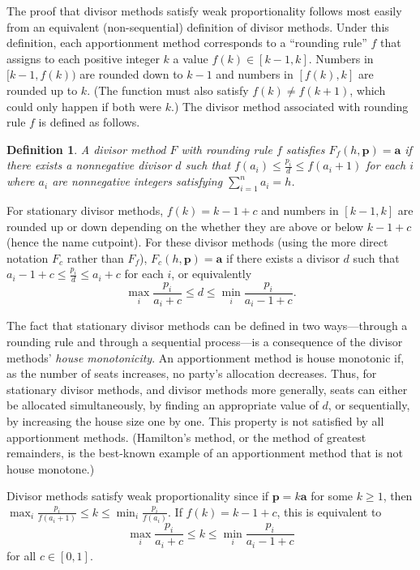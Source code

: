 \documentclass[pdflatex,sn-mathphys-num]{sn-jnl}
\theoremstyle{thmstyleone}%
\theoremstyle{thmstyletwo}%
\theoremstyle{thmstylethree}%
\newtheorem{definition}{Definition}%
\begin{document}
The proof that divisor methods satisfy weak proportionality follows most easily from an equivalent (non-sequential) definition of divisor methods. Under this definition, each apportionment method corresponds to a ``rounding rule'' $f$ that  assigns to each positive integer $k$ a value $f(k) \in [k-1, k]$. Numbers in    $[k-1, f(k))$ are rounded down  to $k -1$ and numbers in $[f(k), k]$ are rounded up to $k$. (The function must also satisfy $f(k) \ne f(k+1)$, which could only happen if both were $k$.)  The divisor method associated with rounding rule $f$ is defined as follows.

\begin{definition}  A divisor method $F$ with rounding rule $f$ satisfies $F_f(h, \mathbf p) = \mathbf a$ if there exists a nonnegative divisor $d$ such that $f(a_i) \le \frac{p_i}{d} \le f(a_i+1)$ for each $i$ where $a_i$ are nonnegative integers satisfying $\sum_{i=1}^n a_i = h$.   \end{definition}

For stationary divisor methods, $f(k) = k-1+c$ and numbers in  $[k-1, k]$ are rounded up or down depending on the whether they are above or below $k-1+c$ (hence the name cutpoint).  For these divisor methods (using the more direct notation $F_c$ rather than $F_f$), $F_c(h, \mathbf p) = \mathbf a$ if there exists a divisor $d$ such that $a_i-1+c \le \frac{p_i}{d} \le a_i+c$ for each $i$, or equivalently
$$\max_i \frac{p_i}{a_i+c} \le d \le \min_i \frac{p_i}{a_i-1+c}.$$

 The fact that stationary divisor methods can be defined in two ways---through a rounding rule and through a sequential process---is a consequence of the divisor methods' {\it house monotonicity}. An apportionment method is house monotonic if, as the number of seats increases, no party's allocation decreases. Thus, for stationary divisor methods, and divisor methods more generally, seats can either be allocated simultaneously, by finding an appropriate value of $d$, or sequentially, by increasing the house size one by one. This property is not satisfied by all apportionment methods. (Hamilton's method, or the method of greatest remainders, is the best-known example of an apportionment method that is not house monotone.)

Divisor methods satisfy weak proportionality since if $\mathbf p = k \mathbf a$ for some $k \ge 1$, then
$\max_i \frac{p_i}{f(a_i+1)} \le k \le \min_i \frac{p_i}{f(a_i)}.$ If $f(k)=k-1+c$, this is equivalent to
$$\max_i \frac{p_i}{a_i+c} \le k \le \min_i \frac{p_i}{a_i-1+c}$$
 for all $c \in [0, 1]$.
 
\end{document}

